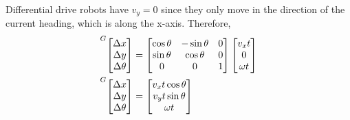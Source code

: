 Differential drive robots have $v_y = 0$ since they only move in the direction
of the current heading, which is along the x-axis. Therefore,
\begin{align*}
  \prescript{G}{}{\begin{bmatrix}
    \Delta x \\
    \Delta y \\
    \Delta \theta
  \end{bmatrix}} &=
  \begin{bmatrix}
    \cos\theta & -\sin\theta & 0 \\
    \sin\theta &  \cos\theta & 0 \\
             0 &           0 & 1
  \end{bmatrix}
  \begin{bmatrix}
    v_x t \\
    0 \\
    \omega t
  \end{bmatrix} \\
  \prescript{G}{}{\begin{bmatrix}
    \Delta x \\
    \Delta y \\
    \Delta \theta
  \end{bmatrix}} &=
  \begin{bmatrix}
    v_x t \cos\theta \\
    v_y t \sin\theta \\
    \omega t
  \end{bmatrix}
\end{align*}
